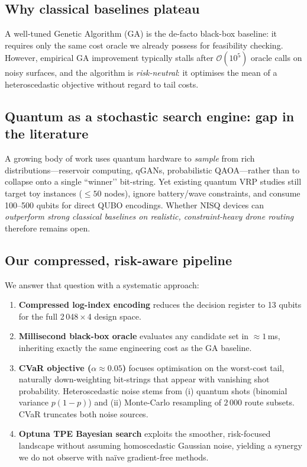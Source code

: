 \subsection{Why classical baselines plateau}

A well-tuned Genetic Algorithm (GA) is the de-facto black-box baseline: it requires only the same cost oracle we already possess for feasibility checking.  
However, empirical GA improvement typically stalls after $\mathcal{O}(10^{5})$ oracle calls on noisy surfaces, and the algorithm is \emph{risk-neutral}: it optimises the mean of a heteroscedastic objective without regard to tail costs.

\subsection{Quantum as a stochastic search engine: gap in the literature}

A growing body of work uses quantum hardware to \emph{sample} from rich distributions---reservoir computing, qGANs, probabilistic QAOA---rather than to collapse onto a single ``winner’’ bit-string.\cite{schuld2019quantum}  
Yet existing quantum VRP studies still target toy instances ($\le 50$ nodes), ignore battery/wave constraints, and consume 100--500 qubits for direct QUBO encodings.\cite{vogel2022quantumvrp}  
Whether NISQ devices can \emph{outperform strong classical baselines on realistic, constraint-heavy drone routing} therefore remains open.

\subsection{Our compressed, risk-aware pipeline}

We answer that question with a systematic approach:

\begin{enumerate}[leftmargin=*,nosep]
\item \textbf{Compressed log-index encoding} reduces the decision register to 13 qubits for the full 2\,048\,$\times$\,4 design space.
\item \textbf{Millisecond black-box oracle} evaluates any candidate set in $\approx1$\,ms, inheriting exactly the same engineering cost as the GA baseline.
\item \textbf{CVaR objective ($\alpha\!\approx\!0.05$)} focuses optimisation on the worst-cost tail, naturally down-weighting bit-strings that appear with vanishing shot probability.
      Heteroscedastic noise stems from (i) quantum shots (binomial variance $p(1-p)$) and (ii) Monte-Carlo resampling of $2\,000$ route subsets.
      CVaR truncates both noise sources.
\item \textbf{Optuna TPE Bayesian search} exploits the smoother, risk-focused landscape without assuming homoscedastic Gaussian noise, yielding a synergy we do not observe with na\"ive gradient-free methods.
\end{enumerate}

